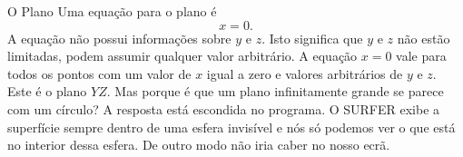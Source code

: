 \begin{surferPage}{O Plano}
Uma equa\c c\~ao para o plano \'e \[x=0.\] A equa\c c\~ao n\~ao possui informa\c c\~oes sobre $y$ e $z$. Isto significa que $y$ e $z$ n\~ao est\~ao limitadas, podem assumir qualquer valor arbitr\'ario.
A equa\c c\~ao $x=0$ vale para todos os pontos com um valor de $x$ igual a zero e valores arbitr\'arios de $y$ e $z$. Este \'e o plano $YZ$.
\newline \newline
Mas porque \'e que um plano infinitamente grande se parece com um c\'irculo? A resposta est\'a escondida no programa. O SURFER exibe a superf\'icie sempre dentro de uma esfera invis\'ivel e n\'os s\'o podemos ver o que est\'a no interior dessa esfera. De outro modo n\~ao iria caber no nosso ecr\~a.
\end{surferPage}
